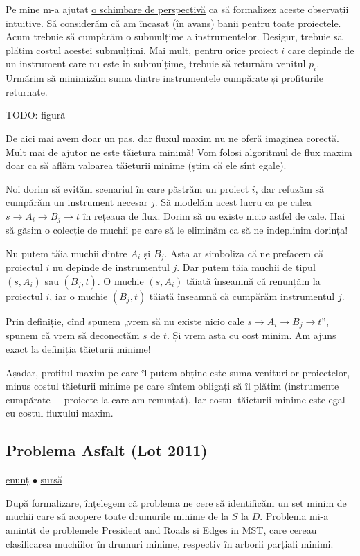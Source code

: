 \documentclass[../main.tex]{subfiles}
\begin{document}
Pe mine m-a ajutat \href{https://codeforces.com/blog/entry/101354}{o schimbare de perspectivă} ca să formalizez aceste observații intuitive. Să considerăm că am încasat (în avans) banii pentru toate proiectele. Acum trebuie să cumpărăm o submulțime a instrumentelor. Desigur, trebuie să plătim costul acestei submulțimi. Mai mult, pentru orice proiect $i$ care depinde de un instrument care nu este în submulțime, trebuie să returnăm venitul $p_i$. Urmărim să minimizăm suma dintre instrumentele cumpărate și profiturile returnate.

TODO: figură

De aici mai avem doar un pas, dar fluxul maxim nu ne oferă imaginea corectă. Mult mai de ajutor ne este tăietura minimă! Vom folosi algoritmul de flux maxim doar ca să aflăm valoarea tăieturii minime (știm că ele sînt egale).

Noi dorim să evităm scenariul în care păstrăm un proiect $i$, dar refuzăm să cumpărăm un instrument necesar $j$. Să modelăm acest lucru ca pe calea $s \to A_i \to B_j \to t$ în rețeaua de flux. Dorim să nu existe nicio astfel de cale. Hai să găsim o colecție de muchii pe care să le eliminăm ca să ne îndeplinim dorința!

Nu putem tăia muchii dintre $A_i$ și $B_j$. Asta ar simboliza că ne prefacem că proiectul $i$ nu depinde de instrumentul $j$.  Dar putem tăia muchii de tipul $(s, A_i)$ sau $(B_j, t)$. O muchie $(s, A_i)$ tăiată înseamnă că renunțăm la proiectul $i$, iar o muchie $(B_j, t)$ tăiată înseamnă că cumpărăm instrumentul $j$.

Prin definiție, cînd spunem „vrem să nu existe nicio cale $s \to A_i \to B_j \to t$”, spunem că vrem să deconectăm $s$ de $t$. Și vrem asta cu cost minim. Am ajuns exact la definiția tăieturii minime!

Așadar, profitul maxim pe care îl putem obține este suma veniturilor proiectelor, minus costul tăieturii minime pe care sîntem obligați să îl plătim (instrumente cumpărate + proiecte la care am renunțat). Iar costul tăieturii minime este egal cu costul fluxului maxim.


\subsection{Problema Asfalt (Lot 2011)}
\label{problem:asfalt}

\href{https://kilonova.ro/problems/2225}{enunț}
$\bullet$
\hyperref[code:asfalt]{sursă}

După formalizare, înțelegem că problema ne cere să identificăm un set minim de muchii care să acopere toate drumurile minime de la $S$ la $D$. Problema mi-a amintit de problemele \hyperref[problem:president-and-roads]{President and Roads} și \hyperref[problem:edges-in-mst]{Edges in MST}, care cereau clasificarea muchiilor în drumuri minime, respectiv în arborii parțiali minimi.
\end{document}
